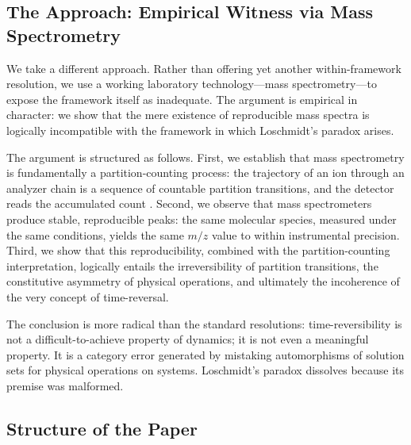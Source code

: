 \documentclass[twocolumn,10pt,a4paper]{article}
\theoremstyle{definition}
\theoremstyle{remark}
\begin{document}
\subsection{The Approach: Empirical Witness via Mass Spectrometry}

We take a different approach. Rather than offering yet another within-framework resolution, we use a working laboratory technology---mass spectrometry---to expose the framework itself as inadequate. The argument is empirical in character: we show that the mere existence of reproducible mass spectra is logically incompatible with the framework in which Loschmidt's paradox arises.

The argument is structured as follows. First, we establish that mass spectrometry is fundamentally a partition-counting process: the trajectory of an ion through an analyzer chain is a sequence of countable partition transitions, and the detector reads the accumulated count \citep{sachikonye2025counting,sachikonye2025partition}. Second, we observe that mass spectrometers produce stable, reproducible peaks: the same molecular species, measured under the same conditions, yields the same $m/z$ value to within instrumental precision. Third, we show that this reproducibility, combined with the partition-counting interpretation, logically entails the irreversibility of partition transitions, the constitutive asymmetry of physical operations, and ultimately the incoherence of the very concept of time-reversal.

The conclusion is more radical than the standard resolutions: time-reversibility is not a difficult-to-achieve property of dynamics; it is not even a meaningful property. It is a category error generated by mistaking automorphisms of solution sets for physical operations on systems. Loschmidt's paradox dissolves because its premise was malformed.

\subsection{Structure of the Paper}
\end{document}
